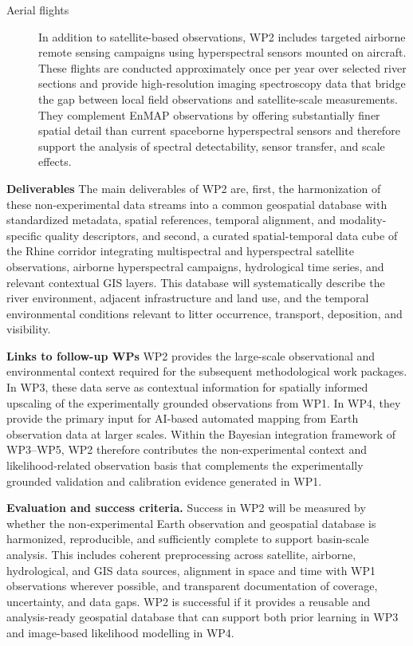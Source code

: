 \documentclass{scrartcl}
\begin{document}
\begin{description}
    \item[Aerial flights] In addition to satellite-based observations, WP2 includes targeted airborne remote sensing campaigns using hyperspectral sensors mounted on aircraft. These flights are conducted approximately once per year over selected river sections and provide high-resolution imaging spectroscopy data that bridge the gap between local field observations and satellite-scale measurements. They complement EnMAP observations by offering substantially finer spatial detail than current spaceborne hyperspectral sensors and therefore support the analysis of spectral detectability, sensor transfer, and scale effects. 
\end{description}

\textbf{Deliverables} The main deliverables of WP2 are, first, the harmonization of these non-experimental data streams into a common geospatial database with standardized metadata, spatial references, temporal alignment, and modality-specific quality descriptors, and second, a curated spatial-temporal data cube of the Rhine corridor integrating multispectral and hyperspectral satellite observations, airborne hyperspectral campaigns, hydrological time series, and relevant contextual GIS layers. This database will systematically describe the river environment, adjacent infrastructure and land use, and the temporal environmental conditions relevant to litter occurrence, transport, deposition, and visibility.

\textbf{Links to follow-up WPs} WP2 provides the large-scale observational and environmental context required for the subsequent methodological work packages. In WP3, these data serve as contextual information for spatially informed upscaling of the experimentally grounded observations from WP1. In WP4, they provide the primary input for AI-based automated mapping from Earth observation data at larger scales. Within the Bayesian integration framework of WP3--WP5, WP2 therefore contributes the non-experimental context and likelihood-related observation basis that complements the experimentally grounded validation and calibration evidence generated in WP1.

\textbf{Evaluation and success criteria.} Success in WP2 will be measured by whether the non-experimental Earth observation and geospatial database is harmonized, reproducible, and sufficiently complete to support basin-scale analysis. This includes coherent preprocessing across satellite, airborne, hydrological, and GIS data sources, alignment in space and time with WP1 observations wherever possible, and transparent documentation of coverage, uncertainty, and data gaps. WP2 is successful if it provides a reusable and analysis-ready geospatial database that can support both prior learning in WP3 and image-based likelihood modelling in WP4.
\end{document}
